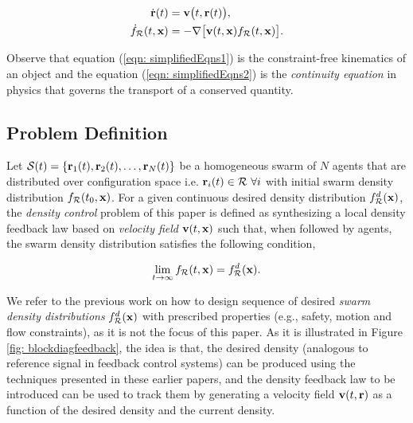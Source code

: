 \documentclass{ifacconf}
\newcommand{\Swarm}{{\mathcal S}}
\newcommand{\Rconf}{{\mathcal R}}
\newcommand{\bx}{{\bf x}}
\newcommand{\br}{{\bf r}}
\newcommand{\bv}{{\bf v}}
\begin{document}
\begin{subequations}
	\begin{align}
	\dot{\br} (t) &= \bv\big(t,\br(t)\big), \label{eqn: simplifiedEqns1} \\
	\dot{f}_\Rconf(t,\bx) &= - \nabla\big[\bv(t,\bx)f_\Rconf(t,\bx)\big]. \label{eqn: simplifiedEqns2}
	\end{align}
\end{subequations}
\vspace{-1mm}
\begin{rem}
	Observe that equation (\ref{eqn: simplifiedEqns1}) is the constraint-free kinematics of an object and the equation (\ref{eqn: simplifiedEqns2}) is the \emph{continuity equation} in physics that governs the transport of a conserved  quantity.
\end{rem}

\subsection{Problem Definition}
Let $\Swarm(t) = \{\br_1(t),\br_2(t),\dots,\br_N(t)\}$ be a homogeneous swarm of $N$  agents that are distributed over configuration space i.e. $\br_i(t) \in \Rconf \ \forall i$ with initial swarm density distribution $f_\Rconf(t_0,\bx)$. For a given continuous desired density distribution $f_\Rconf^d(\bx)$, the \emph{density control} problem  of  this paper is defined as synthesizing a local density feedback law based on \emph{velocity field} $\bv(t,\bx)$ such that, when followed by agents, the swarm density distribution satisfies the following condition,

\begin{equation}
	\lim\limits_{t \rightarrow \infty} f_\Rconf(t,\bx) = f_\Rconf^d(\bx).
\end{equation}

We  refer to the previous work \cite{swarm_denc13_ifac,swarm_denc13_acc,swarm_coll13,swarm_denc14_tac,demir2015probabilistic,demir2015decentralized} on how to design sequence of desired \emph{swarm density distributions} $f_\Rconf^d(\bx)$ with prescribed  properties (e.g., safety, motion and flow constraints), as it is not the  focus of this paper. As it is illustrated in Figure \ref{fig: blockdiagfeedback}, the idea is that, the desired density (analogous to reference signal in feedback control systems)  can be produced using the techniques presented in these earlier papers, and the density feedback law to be introduced   can be used to track them by generating a velocity field $\bv(t,\br)$ as a function of the desired density and the current density. 
\end{document}
